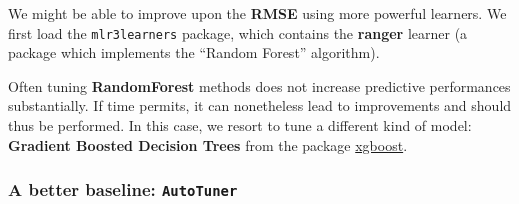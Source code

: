 \documentclass[]{article}
\newenvironment{Shaded}{}{}
\newcommand{\DataTypeTok}[1]{#1}
\newcommand{\DecValTok}[1]{#1}
\newcommand{\KeywordTok}[1]{\textcolor[rgb]{0.00,0.00,1.00}{#1}}
\newcommand{\NormalTok}[1]{#1}
\newcommand{\OperatorTok}[1]{#1}
\newcommand{\StringTok}[1]{\textcolor[rgb]{0.00,0.50,0.50}{#1}}
\renewenvironment{Shaded} {\begin{snugshade}\small} {\end{snugshade}}
\begin{document}
We might be able to improve upon the \textbf{RMSE} using more powerful learners.
We first load the \texttt{mlr3learners} package, which contains the \textbf{ranger} learner (a package which implements the ``Random Forest'' algorithm).

\begin{Shaded}
\end{Shaded}

Often tuning \textbf{RandomForest} methods does not increase predictive performances substantially.
If time permits, it can nonetheless lead to improvements and should thus be performed.
In this case, we resort to tune a different kind of model: \textbf{Gradient Boosted Decision Trees} from the package \href{https://cran.r-project.org/package=xgboost}{xgboost}.

\hypertarget{a-better-baseline-autotuner}{%
\subsubsection{\texorpdfstring{A better baseline: \texttt{AutoTuner}}{A better baseline: AutoTuner}}\label{a-better-baseline-autotuner}}
\end{document}
